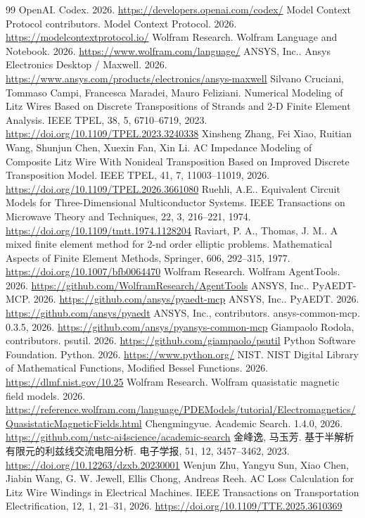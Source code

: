 \begin{thebibliography}{99}
 OpenAI. Codex. 2026. \url{https://developers.openai.com/codex/}
 Model Context Protocol contributors. Model Context Protocol. 2026. \url{https://modelcontextprotocol.io/}
 Wolfram Research. Wolfram Language and Notebook. 2026. \url{https://www.wolfram.com/language/}
 ANSYS, Inc.. Ansys Electronics Desktop / Maxwell. 2026. \url{https://www.ansys.com/products/electronics/ansys-maxwell}
 Silvano Cruciani, Tommaso Campi, Francesca Maradei, Mauro Feliziani. Numerical Modeling of Litz Wires Based on Discrete Transpositions of Strands and 2-D Finite Element Analysis. IEEE TPEL, 38, 5, 6710--6719, 2023. \url{https://doi.org/10.1109/TPEL.2023.3240338}
 Xinsheng Zhang, Fei Xiao, Ruitian Wang, Shunjun Chen, Xuexin Fan, Xin Li. AC Impedance Modeling of Composite Litz Wire With Nonideal Transposition Based on Improved Discrete Transposition Model. IEEE TPEL, 41, 7, 11003--11019, 2026. \url{https://doi.org/10.1109/TPEL.2026.3661080}
 Ruehli, A.E.. Equivalent Circuit Models for Three-Dimensional Multiconductor Systems. IEEE Transactions on Microwave Theory and Techniques, 22, 3, 216--221, 1974. \url{https://doi.org/10.1109/tmtt.1974.1128204}
 Raviart, P. A., Thomas, J. M.. A mixed finite element method for 2-nd order elliptic problems. Mathematical Aspects of Finite Element Methods, Springer, 606, 292--315, 1977. \url{https://doi.org/10.1007/bfb0064470}
 Wolfram Research. Wolfram AgentTools. 2026. \url{https://github.com/WolframResearch/AgentTools}
 ANSYS, Inc.. PyAEDT-MCP. 2026. \url{https://github.com/ansys/pyaedt-mcp}
 ANSYS, Inc.. PyAEDT. 2026. \url{https://github.com/ansys/pyaedt}
 ANSYS, Inc., contributors. ansys-common-mcp. 0.3.5, 2026. \url{https://github.com/ansys/pyansys-common-mcp}
 Giampaolo Rodola, contributors. psutil. 2026. \url{https://github.com/giampaolo/psutil}
 Python Software Foundation. Python. 2026. \url{https://www.python.org/}
 NIST. NIST Digital Library of Mathematical Functions, Modified Bessel Functions. 2026. \url{https://dlmf.nist.gov/10.25}
 Wolfram Research. Wolfram quasistatic magnetic field models. 2026. \url{https://reference.wolfram.com/language/PDEModels/tutorial/Electromagnetics/QuasistaticMagneticFields.html}
 Chengmingyue. Academic Search. 1.4.0, 2026. \url{https://github.com/ustc-ai4science/academic-search}
 金峰逸, 马玉芳. 基于半解析有限元的利兹线交流电阻分析. 电子学报, 51, 12, 3457--3462, 2023. \url{https://doi.org/10.12263/dzxb.20230001}
 Wenjun Zhu, Yangyu Sun, Xiao Chen, Jiabin Wang, G. W. Jewell, Ellis Chong, Andreas Reeh. AC Loss Calculation for Litz Wire Windings in Electrical Machines. IEEE Transactions on Transportation Electrification, 12, 1, 21--31, 2026. \url{https://doi.org/10.1109/TTE.2025.3610369}
\end{thebibliography}
